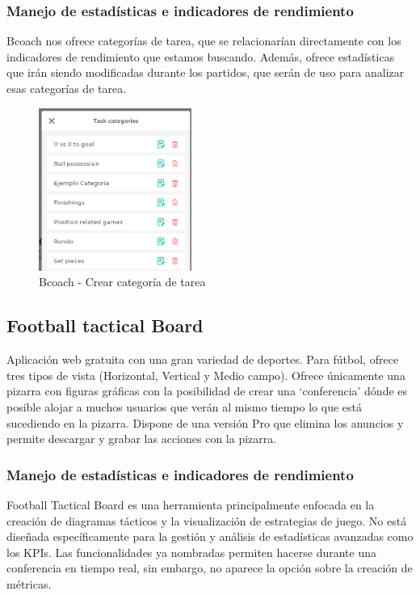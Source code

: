 \subsubsection{Manejo de estadísticas e indicadores de rendimiento}
Bcoach nos ofrece categorías de tarea, que se relacionarían directamente con los indicadores de rendimiento que estamos buscando. Además, ofrece estadísticas que irán siendo modificadas durante los partidos, que serán de uso para analizar esas categorías de tarea.

\begin{figure}[H]
    \centering
    \includegraphics[width=5cm]{archivos/tfg_jorge/bcoach_kpis}
    \caption{Bcoach - Crear categoría de tarea}\label{sistemass2}
\end{figure}

\subsection{Football tactical Board}
Aplicación web gratuita con una gran variedad de deportes. Para fútbol, ofrece tres tipos de vista (Horizontal, Vertical y Medio campo). Ofrece únicamente una pizarra con figuras gráficas con la posibilidad de crear una ‘conferencia’ dónde es posible alojar a muchos usuarios que verán al mismo tiempo lo que está sucediendo en la pizarra.
Dispone de una versión Pro que elimina los anuncios y permite descargar y grabar las acciones con la pizarra.

\subsubsection{Manejo de estadísticas e indicadores de rendimiento}
Football Tactical Board es una herramienta principalmente enfocada en la creación de diagramas tácticos y la visualización de estrategias de juego. No está diseñada específicamente para la gestión y análisis de estadísticas avanzadas como los KPIs. Las funcionalidades ya nombradas permiten hacerse durante una conferencia en tiempo real, sin embargo, no aparece la opción sobre la creación de métricas.

